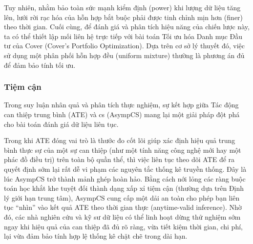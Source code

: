 Tuy nhiên, nhằm bảo toàn sức mạnh kiểm định (power) khi lượng dữ liệu tăng lên,
lưới rời rạc hóa của hỗn hợp bắt buộc phải được tinh chỉnh mịn hơn (finer) theo
thời gian. Cuối cùng, để đánh giá và phân tích hiệu năng của chiến lược này, ta
có thể thiết lập mối liên hệ trực tiếp với bài toán Tối ưu hóa Danh mục Đầu tư
của Cover (Cover's Portfolio Optimization). Dựa trên cơ sở lý thuyết đó, việc
sử dụng một phân phối hỗn hợp đều (uniform mixture) thường là phương án đủ để
đảm bảo tính tối ưu.

\subsubsection{Tiệm cận}

Trong suy luận nhân quả và phân tích thực nghiệm, sự kết hợp giữa Tác động can
thiệp trung bình (ATE) và \gls{cs} (AsympCS) mang lại một
giải pháp đột phá cho bài toán đánh giá dữ liệu liên tục.

Trong khi ATE đóng vai trò là thước đo cốt lõi giúp xác định hiệu quả trung
bình thực sự của một sự can thiệp (như một tính năng công nghệ mới hay một phác
đồ điều trị) trên toàn bộ quần thể, thì việc liên tục theo dõi ATE để ra quyết
định sớm lại rất dễ vi phạm các nguyên tắc thống kê truyền thống. Đây là lúc
AsympCS trở thành mảnh ghép hoàn hảo. Bằng cách nới lỏng các ràng buộc toán học
khắt khe tuyệt đối thành dạng xấp xỉ tiệm cận (thường dựa trên Định lý giới hạn
trung tâm), AsympCS cung cấp một dải an toàn cho phép bạn liên tục ``nhìn'' vào
kết quả ATE theo thời gian thực (anytime-valid inference). Nhờ đó, các nhà
nghiên cứu và kỹ sư dữ liệu có thể linh hoạt dừng thử nghiệm sớm ngay khi hiệu
quả của can thiệp đã đủ rõ ràng, vừa tiết kiệm thời gian, chi phí, lại vừa đảm
bảo tính hợp lệ thống kê chặt chẽ trong dài hạn.
